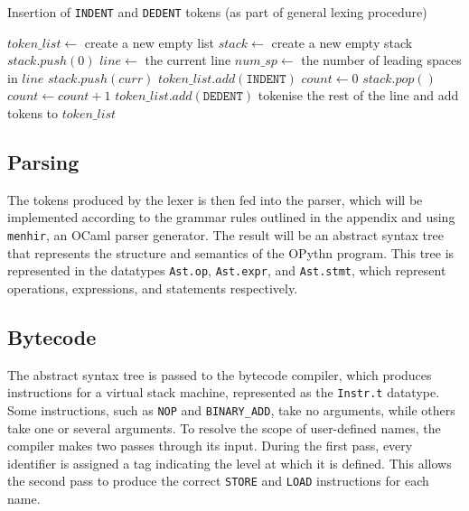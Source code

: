 \documentclass[11pt, twoside]{article}
\newcommand{\ms}{\texttt}
\begin{document}
    \begin{algorithm}
    \caption{Insertion of \ms{INDENT} and \ms{DEDENT} tokens (as part of general lexing procedure)}
    \begin{algorithmic}[1]
        \State $token\_list \gets$ create a new empty list
        \State $stack \gets$ create a new empty stack
        \State $stack.push(0)$
            \State $line \gets$ the current line
            \State $num\_sp \gets$ the number of leading spaces in $line$
                $stack.push(curr)$
                $token\_list.add(\ms{INDENT})$
                \State $count\gets 0$
                    \State $stack.pop()$
                    \State $count\gets count + 1$
                \EndWhile
                    \State $token\_list.add(\ms{DEDENT})$
                \EndFor
                \EndIf
                \State tokenise the rest of the line and add tokens to $token\_list$
        \EndWhile
        \State {}
    \EndProcedure
    \end{algorithmic}
    \end{algorithm}
    \subsection{Parsing}
    The tokens produced by the lexer is then fed into the parser, which will be implemented according to the grammar rules outlined in the appendix and using \texttt{menhir}, an OCaml parser generator. The result will be an abstract syntax tree that represents the structure and semantics of the OPythn program. This tree is represented in the datatypes \ms{Ast.op}, \ms{Ast.expr}, and \ms{Ast.stmt}, which represent operations, expressions, and statements respectively.

    \subsection{Bytecode}
    The abstract syntax tree is passed to the bytecode compiler, which produces instructions for a virtual stack machine, represented as the \ms{Instr.t} datatype. Some instructions, such as \ms{NOP} and \ms{BINARY\_ADD}, take no arguments, while others take one or several arguments. To resolve the scope of user-defined names, the compiler makes two passes through its input. During the first pass, every identifier is assigned a tag indicating the level at which it is defined. This allows the second pass to produce the correct \ms{STORE} and \ms{LOAD} instructions for each name.
\end{document}
